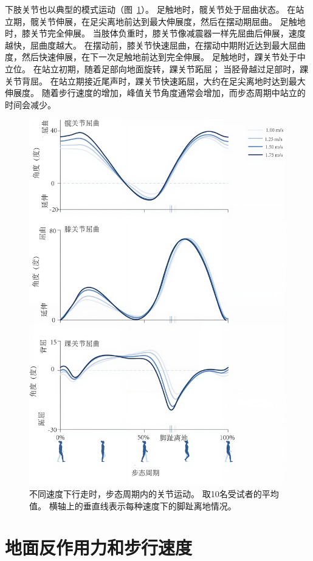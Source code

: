 下肢关节也以典型的模式运动（图~\ref{fig:2_19}）。
足触地时，髋关节处于屈曲状态。
在站立期，髋关节伸展，在足尖离地前达到最大伸展度，然后在摆动期屈曲。
足触地时，膝关节完全伸展。
当肢体负重时，膝关节像减震器一样先屈曲后伸展，速度越快，屈曲度越大。
在摆动前，膝关节快速屈曲，在摆动中期附近达到最大屈曲度，然后快速伸展，在下一次足触地前达到完全伸展。
足触地时，踝关节处于中立位。
在站立初期，随着足部向地面旋转，踝关节跖屈；
当胫骨越过足部时，踝关节背屈。
在站立期接近尾声时，踝关节快速跖屈，大约在足尖离地时达到最大伸展度。
随着步行速度的增加，峰值关节角度通常会增加，而步态周期中站立的时间会减少。


\begin{figure}[!htb]
	\centering
	\includegraphics[width=0.9\linewidth]{chap2/2_19}
	\caption{不同速度下行走时，步态周期内的关节运动。
		取10名受试者的平均值。
		横轴上的垂直线表示每种速度下的脚趾离地情况\cite{arnold2013muscle}。 \label{fig:2_19}}
\end{figure}


\section{地面反作用力和步行速度}

